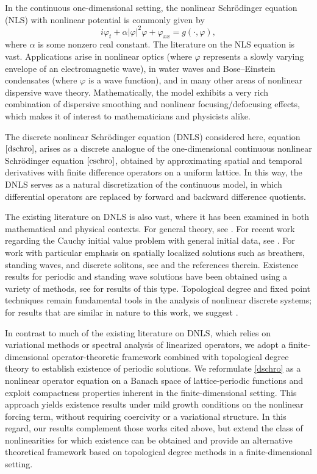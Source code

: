 \documentclass[12 pt,twoside]{amsart}
\newcommand{\be}{\begin{equation}}
\newcommand{\ee}{\end{equation}}
\renewcommand{\phi}{\varphi}
\numberwithin{equation}{section}
\theoremstyle{definition}
\theoremstyle{remark}
\begin{document}
In the continuous one-dimensional setting, the nonlinear Schr\"{o}dinger equation (NLS) with nonlinear potential is commonly given by
\be\label{cschro}
i\phi_t+\alpha|\phi|^2\phi+\phi_{xx}=g(\cdot, \phi),
\ee
where $\alpha$ is some nonzero real constant.
The literature on the NLS equation is vast. Applications arise in nonlinear optics (where $\phi$ represents a slowly varying envelope of an electromagnetic wave), in water waves and Bose–Einstein condensates (where $\phi$ is a wave function), and in many other areas of nonlinear dispersive wave theory. Mathematically, the model exhibits a very rich combination of dispersive smoothing and nonlinear focusing/defocusing effects, which makes it of interest to mathematicians and physicists alike.

{The discrete nonlinear Schr\"odinger equation (DNLS) considered here, equation $\eqref{dschro}$, arises as a discrete analogue of the one-dimensional continuous nonlinear Schr\"odinger equation $\eqref{cschro}$, obtained by approximating spatial and temporal derivatives with finite difference operators on a uniform lattice. In this way, the DNLS serves as a natural discretization of the continuous model, in which differential operators are replaced by forward and backward difference quotients.}

The existing literature on DNLS is also vast, where it has been examined in both mathematical and physical contexts.  For general theory, see \cite{AblowitzLadik,HennigTsironis,Kevrekidis}. {For recent work regarding the Cauchy initial value problem with general initial data, see} \cite{Vuoksenmaa2024}.  For work with particular emphasis on spatially localized solutions such as breathers, standing waves, and discrete solitons, see \cite{Brunhuber,FlachWillis,Flach2003,Zhang2009} and the references therein. Existence results for periodic and standing wave solutions have been obtained using a variety of methods, see \cite{Bak2010,ZhangMa} for results of this type. Topological degree and fixed point techniques remain fundamental tools in the analysis of nonlinear discrete systems; for results that are similar in nature to this work, we suggest \cite{BereanuMawhin, MaroncelliDiscreteBounded, marrod,MaroncelliMult,Rouche}.

In contrast to much of the existing literature on DNLS, which relies on variational methods or spectral analysis of linearized operators, we adopt a finite-dimensional operator-theoretic framework combined with topological degree theory to establish existence of periodic solutions. We reformulate \eqref{dschro} as a nonlinear operator equation on a Banach space of lattice-periodic functions and exploit compactness properties inherent in the finite-dimensional setting. This approach yields existence results under mild growth conditions on the nonlinear forcing term, without requiring coercivity or a variational structure.  {In this regard, our results complement those works cited above, but extend the class of nonlinearities for which existence can be obtained and provide an alternative theoretical framework based on topological degree methods in a finite-dimensional setting.}
\end{document}
